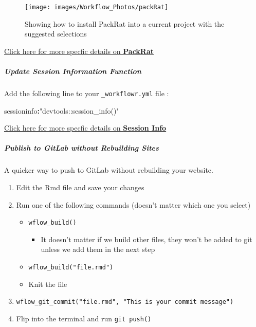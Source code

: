 \documentclass[openany]{article}
\newenvironment{Shaded}{\begin{snugshade}}{\end{snugshade}}
\newcommand{\NormalTok}[1]{#1}
\newcommand{\OperatorTok}[1]{\textcolor[rgb]{0.81,0.36,0.00}{\textbf{#1}}}
\newcommand{\StringTok}[1]{\textcolor[rgb]{0.31,0.60,0.02}{#1}}
\providecommand{\tightlist}{%
  \setlength{\itemsep}{0pt}\setlength{\parskip}{0pt}}
\let\oldsubparagraph\subparagraph
\renewcommand{\subparagraph}[1]{\oldsubparagraph{#1}\mbox{}}
\begin{document}
\begin{figure}

{\centering \texttt{[image: images/Workflow\_Photos/packRat]} 

}

\caption{Showing how to install PackRat into a current project with the suggested selections}\label{fig:c999}
\end{figure}

\protect\hyperlink{adding-packrat-1}{Click here for more specfic details on \textbf{PackRat}}

\hypertarget{update-session-information-function}{%
\subparagraph{Update Session Information Function}\label{update-session-information-function}}

Add the following line to your \texttt{\_workflowr.yml} file :

\begin{Shaded}
\begin{Highlighting}[]
\NormalTok{sessioninfo}\OperatorTok{:}\StringTok{"devtools::session_info()"}
\end{Highlighting}
\end{Shaded}

\protect\hyperlink{update-session-information-function-1}{Click here for more specfic details on \textbf{Session Info}}

\hypertarget{publish-to-gitlab-without-rebuilding-sites}{%
\subparagraph{Publish to GitLab without Rebuilding Sites}\label{publish-to-gitlab-without-rebuilding-sites}}

A quicker way to push to GitLab without rebuilding your website.

\begin{enumerate}
\def\labelenumi{\arabic{enumi}.}
\tightlist
\item
  Edit the Rmd file and save your changes
\item
  Run one of the following commands (doesn't matter which one you select)

  \begin{itemize}
  \tightlist
  \item
    \texttt{wflow\_build()}

    \begin{itemize}
    \tightlist
    \item
      It doesn't matter if we build other files, they won't be added to git unless we add them in the next step
    \end{itemize}
  \item
    \texttt{wflow\_build("file.rmd")}
  \item
    Knit the file
  \end{itemize}
\item
  \texttt{wflow\_git\_commit("file.rmd",\ "This\ is\ your\ commit\ message")}
\item
  Flip into the terminal and run \texttt{git\ push()}
\end{enumerate}
\end{document}

